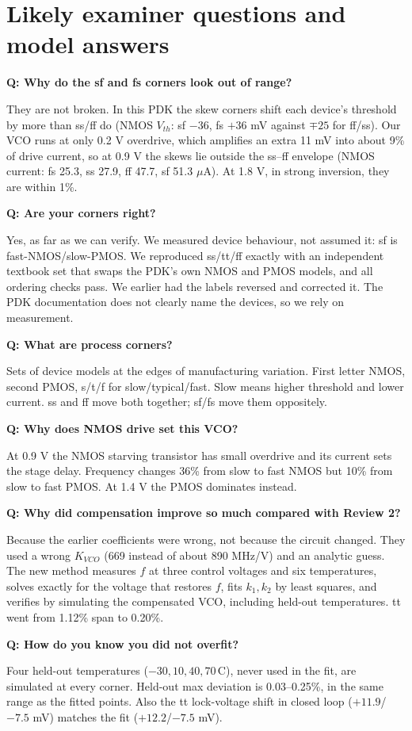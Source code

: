 \documentclass[11pt,a4paper]{article}
\newcommand{\qa}[2]{\par\smallskip\noindent\textbf{Q: #1}\par\noindent\hspace*{1em}\begin{minipage}[t]{\dimexpr\linewidth-1em}#2\end{minipage}\par}
\newcommand{\degC}{\textdegree C}
\begin{document}
\section{Likely examiner questions and model answers}
\qa{Why do the sf and fs corners look out of range?}{They are not broken. In this PDK the skew corners shift each device's threshold by more than ss/ff do (NMOS $V_{th}$: sf $-36$, fs $+36$ mV against $\mp25$ for ff/ss). Our VCO runs at only 0.2 V overdrive, which amplifies an extra 11 mV into about 9\% of drive current, so at 0.9 V the skews lie outside the ss--ff envelope (NMOS current: fs 25.3, ss 27.9, ff 47.7, sf 51.3 $\mu$A). At 1.8 V, in strong inversion, they are within 1\%.}

\qa{Are your corners right?}{Yes, as far as we can verify. We measured device behaviour, not assumed it: sf is fast-NMOS/slow-PMOS. We reproduced ss/tt/ff exactly with an independent textbook set that swaps the PDK's own NMOS and PMOS models, and all ordering checks pass. We earlier had the labels reversed and corrected it. The PDK documentation does not clearly name the devices, so we rely on measurement.}

\qa{What are process corners?}{Sets of device models at the edges of manufacturing variation. First letter NMOS, second PMOS, s/t/f for slow/typical/fast. Slow means higher threshold and lower current. ss and ff move both together; sf/fs move them oppositely.}

\qa{Why does NMOS drive set this VCO?}{At 0.9 V the NMOS starving transistor has small overdrive and its current sets the stage delay. Frequency changes 36\% from slow to fast NMOS but 10\% from slow to fast PMOS. At 1.4 V the PMOS dominates instead.}

\qa{Why did compensation improve so much compared with Review 2?}{Because the earlier coefficients were wrong, not because the circuit changed. They used a wrong $K_{VCO}$ (669 instead of about 890 MHz/V) and an analytic guess. The new method measures $f$ at three control voltages and six temperatures, solves exactly for the voltage that restores $f$, fits $k_1,k_2$ by least squares, and verifies by simulating the compensated VCO, including held-out temperatures. tt went from 1.12\% span to 0.20\%.}

\qa{How do you know you did not overfit?}{Four held-out temperatures ($-30,10,40,70$\,\degC), never used in the fit, are simulated at every corner. Held-out max deviation is 0.03--0.25\%, in the same range as the fitted points. Also the tt lock-voltage shift in closed loop ($+11.9$/$-7.5$ mV) matches the fit ($+12.2$/$-7.5$ mV).}
\end{document}
